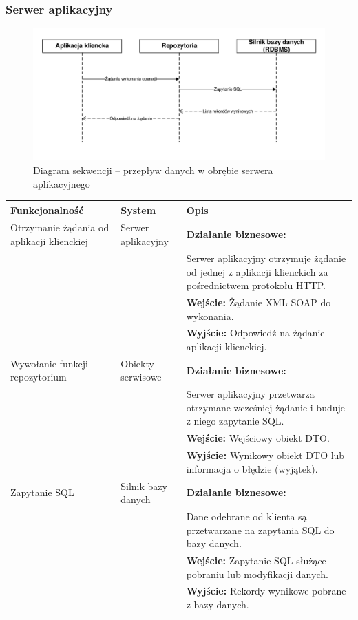 \documentclass[10pt,a4paper]{article}
\begin{document}
\subsubsection{Serwer aplikacyjny}
\begin{figure}[H]
	\includegraphics[width=16cm]{sequence-server.pdf}
	\caption{Diagram sekwencji -- przepływ danych w obrębie serwera aplikacyjnego}
\end{figure}
\begin{table}[H]
	\begin{tabularx}{\textwidth}{|l|l|X|}
		\hline
		\textbf{Funkcjonalność} & \textbf{System} & \textbf{Opis} \\
		\hline
		Otrzymanie żądania od aplikacji klienckiej &
		Serwer aplikacyjny &
		\textbf{Działanie biznesowe:} \\
		& & Serwer aplikacyjny otrzymuje żądanie od jednej z aplikacji klienckich za pośrednictwem protokołu HTTP. \\
		& & \textbf{Wejście:} Żądanie XML SOAP do wykonania. \\
		& & \textbf{Wyjście:} Odpowiedź na żądanie aplikacji klienckiej. \\
		\hline
		Wywołanie funkcji repozytorium &
		Obiekty serwisowe &
		\textbf{Działanie biznesowe:} \\
		& & Serwer aplikacyjny przetwarza otrzymane wcześniej żądanie i buduje z niego zapytanie SQL. \\
		& & \textbf{Wejście:} Wejściowy obiekt DTO. \\
		& & \textbf{Wyjście:} Wynikowy obiekt DTO lub informacja o błędzie (wyjątek). \\
		\hline
		Zapytanie SQL &
		Silnik bazy danych &
		\textbf{Działanie biznesowe:} \\
		& & Dane odebrane od klienta są przetwarzane na zapytania SQL do bazy danych. \\
		& & \textbf{Wejście:} Zapytanie SQL służące pobraniu lub modyfikacji danych. \\
		& & \textbf{Wyjście:} Rekordy wynikowe pobrane z bazy danych. \\
		\hline
	\end{tabularx}
\end{table}
\end{document}
